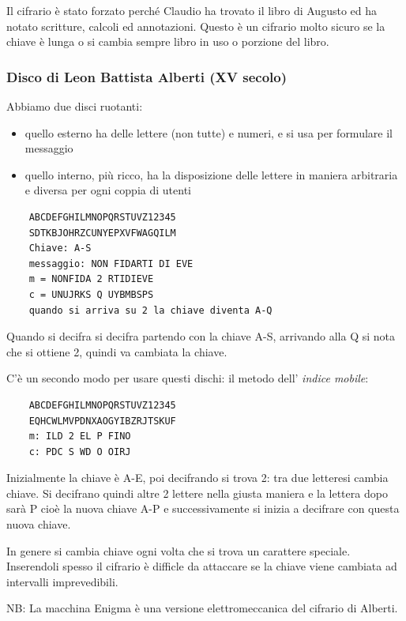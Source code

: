Il cifrario è stato forzato perché Claudio ha trovato il libro di Augusto ed ha notato scritture, calcoli ed annotazioni.
Questo è un cifrario molto sicuro se la chiave è lunga o si cambia sempre libro in uso o porzione del libro.

\subsubsection{Disco di Leon Battista Alberti (XV secolo)}
Abbiamo due disci ruotanti:
\begin{itemize}
    \item quello esterno ha delle lettere (non tutte) e numeri, e si usa per formulare il messaggio
    \item quello interno, più ricco, ha la disposizione delle lettere in maniera arbitraria e diversa per ogni coppia di utenti
\end{itemize}

\begin{verbatim}
    ABCDEFGHILMNOPQRSTUVZ12345
    SDTKBJOHRZCUNYEPXVFWAGQILM
    Chiave: A-S
    messaggio: NON FIDARTI DI EVE
    m = NONFIDA 2 RTIDIEVE
    c = UNUJRKS Q UYBMBSPS
    quando si arriva su 2 la chiave diventa A-Q
\end{verbatim}

Quando si decifra si decifra partendo con la chiave A-S, arrivando alla Q si nota che si ottiene 2, quindi va cambiata la chiave.

C'è un secondo modo per usare questi dischi: il metodo dell' \emph{indice mobile}:
\begin{verbatim}
    ABCDEFGHILMNOPQRSTUVZ12345
    EQHCWLMVPDNXAOGYIBZRJTSKUF
    m: ILD 2 EL P FINO
    c: PDC S WD O OIRJ
\end{verbatim}

Inizialmente la chiave è A-E, poi decifrando si trova 2: tra due letteresi cambia chiave. Si decifrano quindi altre 2 lettere nella giusta maniera e la lettera dopo sarà P cioè la nuova chiave A-P e successivamente si inizia a decifrare con questa nuova chiave.

In genere si cambia chiave ogni volta che si trova un carattere speciale. Inserendoli spesso il cifrario è difficle da attaccare se la chiave viene cambiata ad intervalli imprevedibili.

NB: La macchina Enigma è una versione elettromeccanica del cifrario di Alberti.


